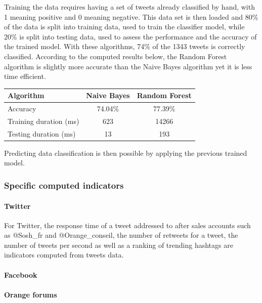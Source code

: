 \documentclass[11pt]{article}
\begin{document}
\vspace{9pt}
Training the data requires having a set of tweets already classified by hand, with 1 meaning positive and 0 meaning negative. This data set is then loaded and 80\% of the data is split into training data, used to train the classifier model, while 20\% is split into testing data, used to assess the performance and the accuracy of the trained model.
With these algorithms, 74\% of the 1343 tweets is correctly classified. According to the computed results below, the Random Forest algorithm is slightly more accurate than the Naive Bayes algorithm yet it is less time efficient. %

\begin{center}
\begin{tabular}{|l|c|c|}
  \hline
  Algorithm & Naive Bayes & Random Forest \\
  \hline
  Accuracy & 74.04\% & 77.39\% \\ \hline
  Training duration (ms) & 623 & 14266 \\ \hline
  Testing duration (ms) & 13 & 193 \\
  \hline
\end{tabular}
\end{center}

Predicting data classification is then possible by applying the previous trained model.

\subsubsection{Specific computed indicators}

\paragraph{Twitter}

For \textsf{Twitter}, the response time of a tweet addressed to after sales accounts such as \textsf{@Sosh\_fr} and \textsf{@Orange\_conseil}, the number of retweets for a tweet, the number of tweets per second as well as a ranking of trending hashtags are indicators computed from tweets data.

\paragraph{Facebook}

\paragraph{Orange forums}
\end{document}
